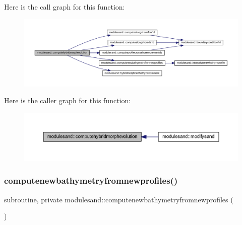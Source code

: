 Here is the call graph for this function\+:\nopagebreak
\begin{figure}[H]
\begin{center}
\leavevmode
\includegraphics[width=350pt]{namespacemodulesand_ac778a6b170dc738d265d1108248728f3_cgraph}
\end{center}
\end{figure}
Here is the caller graph for this function\+:\nopagebreak
\begin{figure}[H]
\begin{center}
\leavevmode
\includegraphics[width=350pt]{namespacemodulesand_ac778a6b170dc738d265d1108248728f3_icgraph}
\end{center}
\end{figure}
\mbox{\label{namespacemodulesand_a27c9023e77c121f3086720bf6e9e8842}} 
\subsubsection{\texorpdfstring{computenewbathymetryfromnewprofiles()}{computenewbathymetryfromnewprofiles()}}
{\footnotesize\ttfamily subroutine, private modulesand\+::computenewbathymetryfromnewprofiles (\begin{DoxyParamCaption}{ }\end{DoxyParamCaption})\hspace{0.3cm}{\ttfamily [private]}}

